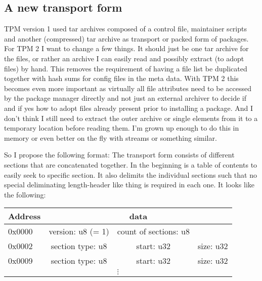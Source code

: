 \documentclass[a4paper]{scrartcl}
\begin{document}
	
	\subsection{A new transport form}
	\label{ssec:a_new_transport_form}
	
	TPM version 1 used tar archives composed of a control file, maintainer scripts and another (compressed) tar archive as transport or packed form of packages. For TPM 2 I want to change a few things. It should just be one tar archive for the files, or rather an archive I can easily read and possibly extract (to adopt files) by hand. This removes the requirement of having a file list be duplicated together with hash sums for config files in the meta data. With TPM 2 this becomes even more important as virtually all file attributes need to be accessed by the package manager directly and not just an external archiver to decide if and if yes how to adopt files already present prior to installing a package. And I don't think I still need to extract the outer archive or single elements from it to a temporary location before reading them. I'm grown up enough to do this in memory or even better on the fly with streams or something similar.
	
	So I propose the following format: The transport form consists of different sections that are concatenated together. In the beginning is a table of contents to easily seek to specific section. It also delimits the individual sections such that no special deliminating length-header like thing is required in each one. It looks like the following:
	
	\vspace{1eM}
	
	\begin{center}
		\begin{tabular}{|l|c|c|c|}
			\hline
			Address & \multicolumn{3}{c|}{data} \\
			\hline
			0x0000 & version: u8 (= 1) & count of sections: u8 & \\
			\hline
			0x0002 & section type: u8 & start: u32 & size: u32 \\
			\hline
			0x0009 & section type: u8 & start: u32 & size: u32 \\
			\hline
			\multicolumn{4}{|c|}{$\vdots$} \\
			\hline
		\end{tabular}
	\end{center}
	
	\vspace{1eM}
	
\end{document}
